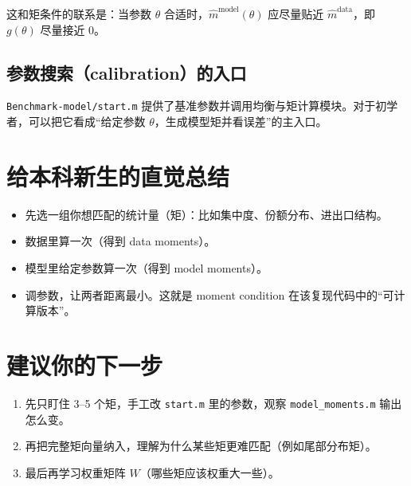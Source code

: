 \documentclass[12pt]{article}
\begin{document}


这和矩条件的联系是：当参数 $\theta$ 合适时，$\hat m^{\text{model}}(\theta)$ 应尽量贴近 $\hat m^{\text{data}}$，即 $g(\theta)$ 尽量接近 0。

\subsection{参数搜索（calibration）的入口}
\texttt{Benchmark-model/start.m} 提供了基准参数并调用均衡与矩计算模块。对于初学者，可以把它看成“给定参数 $\theta$，生成模型矩并看误差”的主入口。



\section{给本科新生的直觉总结}
\begin{itemize}
  \item 先选一组你想匹配的统计量（矩）：比如集中度、份额分布、进出口结构。
  \item 数据里算一次（得到 data moments）。
  \item 模型里给定参数算一次（得到 model moments）。
  \item 调参数，让两者距离最小。这就是 moment condition 在该复现代码中的“可计算版本”。
\end{itemize}

\section{建议你的下一步}
\begin{enumerate}
  \item 先只盯住 3--5 个矩，手工改 \texttt{start.m} 里的参数，观察 \texttt{model\_moments.m} 输出怎么变。
  \item 再把完整矩向量纳入，理解为什么某些矩更难匹配（例如尾部分布矩）。
  \item 最后再学习权重矩阵 $W$（哪些矩应该权重大一些）。
\end{enumerate}
\end{document}

